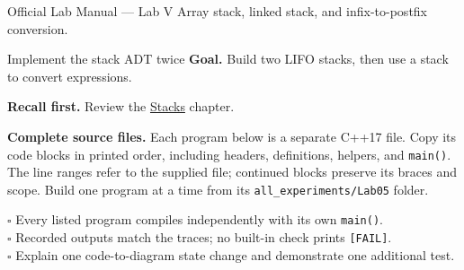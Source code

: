 
\begin{sourcealignment}{Official Lab Manual --- Lab V}
Array stack, linked stack, and infix-to-postfix conversion.
\end{sourcealignment}

\begin{labproject}{Implement the stack ADT twice}
\textbf{Goal.} Build two LIFO stacks, then use a stack to convert expressions.

\textbf{Recall first.} Review the \hyperref[ch:stacks]{Stacks} chapter.

\textbf{Complete source files.} Each program below is a separate C++17 file.
Copy its code blocks in printed order, including headers, definitions, helpers, and \texttt{main()}.
The line ranges refer to the supplied file; continued blocks preserve its braces and scope.
Build one program at a time from its \texttt{all\_experiments/Lab05} folder.



\tcbbreak


\tcbbreak

\end{labproject}

\begin{verification}
$\square$ Every listed program compiles independently with its own \texttt{main()}.\\
$\square$ Recorded outputs match the traces; no built-in check prints \texttt{[FAIL]}.\\
$\square$ Explain one code-to-diagram state change and demonstrate one additional test.
\end{verification}
